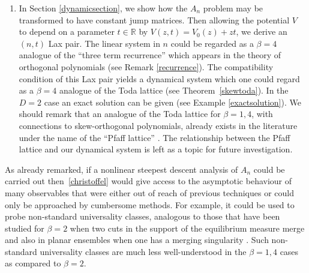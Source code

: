 \documentclass[pdftex]{sigma}
\numberwithin{equation}{section}
\begin{document}
\begin{enumerate}
\item[(3)] In Section \ref{dynamicsection}, we show how the $A_n$ problem may be transformed to have constant jump matrices. Then allowing the potential $V$ to depend on a parameter $t \in \mathbb{R}$ by $V(z,t) = V_0(z) + zt$, we derive an $(n,t)$ Lax pair. The linear system in $n$ could be regarded as a $\beta = 4$ analogue of the \enquote{three term recurrence} which appears in the theory of orthogonal polynomials (see Remark \ref{recurrence}). The compatibility condition of this Lax pair yields a dynamical system which one could regard as a $\beta=4$ analogue of the Toda lattice (see Theorem~\ref{skewtoda}). In the $D=2$ case an exact solution can be given (see Example \ref{exactsolution}). We should remark that an analogue of the Toda lattice for $\beta = 1,4$, with connections to skew-orthogonal polynomials, already exists in the literature under the name of the \enquote{Pfaff lattice} \cite{Adler1999ThePL}. The relationship between the Pfaff lattice and our dynamical system is left as a topic for future investigation.
\end{enumerate}
As already remarked, if a nonlinear steepest descent analysis of $A_n$ could be carried out then~\eqref{christoffel} would give access to the asymptotic behaviour of many observables that were either out of reach of previous techniques or could only be approached by cumbersome methods. For example, it could be used to probe non-standard universality classes, analogous to those that have been studied for $\beta = 2$ when two cuts in the support of the equilibrium measure merge \cite{https://doi.org/10.1002/cpa.10065, https://doi.org/10.1002/cpa.20113,Claeys2005MulticriticalUR} and also in planar ensembles when one has a merging singularity \cite{kruger2024local}. Such non-standard universality classes are much less well-understood in the $\beta = 1,4$ cases as compared to $\beta = 2$.
\end{document}

